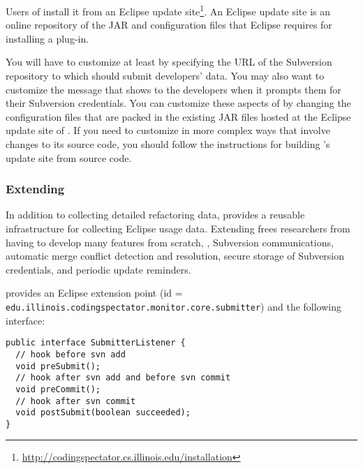 Users of \CodingSpectator{} install it from an Eclipse update
site\footnote{\url{http://codingspectator.cs.illinois.edu/installation}}. An
Eclipse update site is an online repository of the JAR and configuration files
that Eclipse requires for installing a plug-in.

You will have to customize \CodingSpectator{} at least by specifying the URL of
the Subversion repository to which \CodingSpectator{} should submit developers' data.
You may also want to customize the message that \CodingSpectator{} shows to the
developers when it prompts them for their Subversion credentials. You can customize
these aspects of \CodingSpectator{} by changing the configuration files that are
packed in the existing JAR files hosted at the Eclipse update site of
\CodingSpectator. If you need to customize \CodingSpectator{} in more complex
ways that involve changes to its source code, you should follow the instructions
for building \CodingSpectator's update site from source code.

\subsubsection{Extending \CodingSpectator}

In addition to collecting detailed refactoring data, \CodingSpectator{} provides
a reusable infrastructure for collecting Eclipse usage data. Extending
\CodingSpectator{} frees researchers from having to develop many features from
scratch, \eg, Subversion communications, automatic merge conflict detection and
resolution, secure storage of Subversion credentials, and periodic update
reminders.

\CodingSpectator{} provides an Eclipse extension point (id =
\texttt{edu.\-illinois.\-codingspectator.\-monitor.\-core.\-submitter}) and the
following interface:

\begin{lstlisting}
public interface SubmitterListener {
  // hook before svn add
  void preSubmit();
  // hook after svn add and before svn commit
  void preCommit();
  // hook after svn commit
  void postSubmit(boolean succeeded);
}
\end{lstlisting}

